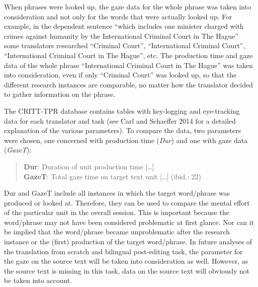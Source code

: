 \documentclass[output=paper]{langsci/langscibook}
\begin{document}
When phrases were looked up, the gaze data for the whole phrase was taken into consideration and not only for the words that were actually looked up. For example, in the dependent sentence “which includes one minister charged with crimes against humanity by the International Criminal Court in The Hague” some translators researched “Criminal Court”, “International Criminal Court”, “International Criminal Court in The Hague”, etc. The production time and gaze data of the whole phrase “International Criminal Court in The Hague” was taken into consideration, even if only “Criminal Court” was looked up, so that the different research instances are comparable, no matter how the translator decided to gather information on the phrase.



The CRITT-TPR database contains tables with key-logging and eye-tracking data for each translator and task (see Carl and Schaeffer 2014 for a detailed explanation of the various parameters). To compare the data, two parameters were chosen, one concerned with production time (\textit{Dur}) and one with gaze data (\textit{GazeT}):


\begin{quotation}
 \textbf{Dur}: Duration of unit production time […]\\
  \textbf{GazeT}: Total gaze time on target text unit […] (ibid.: 22) 
\end{quotation}

Dur and GazeT include all instances in which the target word/phrase was produced or looked at. Therefore, they can be used to compare the mental effort of the particular unit in the overall session. This is important because the word/phrase may not have been considered problematic at first glance. Nor can it be implied that the word/phrase became unproblematic after the research instance or the (first) production of the target word/phrase. In future analyses of the translation from scratch and bilingual post-editing task, the parameter for the gaze on the source text will be taken into consideration as well. However, as the source text is missing in this task, data on the source text will obviously not be taken into account.
\end{document}
